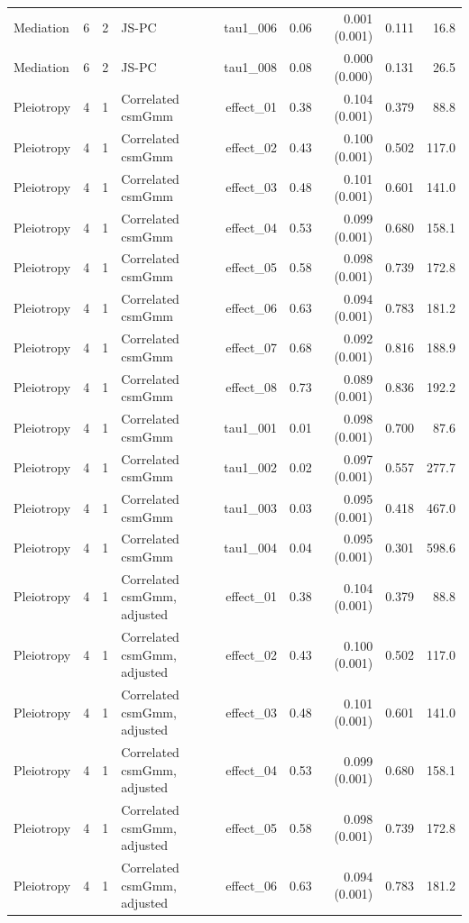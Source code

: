 \begin{longtable}{lcclrrrrr}
Mediation & 6 & 2 & JS-PC & tau1\_006 & 0.06 & 0.001 (0.001) & 0.111 & 16.8\\
Mediation & 6 & 2 & JS-PC & tau1\_008 & 0.08 & 0.000 (0.000) & 0.131 & 26.5\\
Pleiotropy & 4 & 1 & Correlated csmGmm & effect\_01 & 0.38 & 0.104 (0.001) & 0.379 & 88.8\\
Pleiotropy & 4 & 1 & Correlated csmGmm & effect\_02 & 0.43 & 0.100 (0.001) & 0.502 & 117.0\\
Pleiotropy & 4 & 1 & Correlated csmGmm & effect\_03 & 0.48 & 0.101 (0.001) & 0.601 & 141.0\\
Pleiotropy & 4 & 1 & Correlated csmGmm & effect\_04 & 0.53 & 0.099 (0.001) & 0.680 & 158.1\\
Pleiotropy & 4 & 1 & Correlated csmGmm & effect\_05 & 0.58 & 0.098 (0.001) & 0.739 & 172.8\\
Pleiotropy & 4 & 1 & Correlated csmGmm & effect\_06 & 0.63 & 0.094 (0.001) & 0.783 & 181.2\\
Pleiotropy & 4 & 1 & Correlated csmGmm & effect\_07 & 0.68 & 0.092 (0.001) & 0.816 & 188.9\\
Pleiotropy & 4 & 1 & Correlated csmGmm & effect\_08 & 0.73 & 0.089 (0.001) & 0.836 & 192.2\\
Pleiotropy & 4 & 1 & Correlated csmGmm & tau1\_001 & 0.01 & 0.098 (0.001) & 0.700 & 87.6\\
Pleiotropy & 4 & 1 & Correlated csmGmm & tau1\_002 & 0.02 & 0.097 (0.001) & 0.557 & 277.7\\
Pleiotropy & 4 & 1 & Correlated csmGmm & tau1\_003 & 0.03 & 0.095 (0.001) & 0.418 & 467.0\\
Pleiotropy & 4 & 1 & Correlated csmGmm & tau1\_004 & 0.04 & 0.095 (0.001) & 0.301 & 598.6\\
Pleiotropy & 4 & 1 & Correlated csmGmm, adjusted & effect\_01 & 0.38 & 0.104 (0.001) & 0.379 & 88.8\\
Pleiotropy & 4 & 1 & Correlated csmGmm, adjusted & effect\_02 & 0.43 & 0.100 (0.001) & 0.502 & 117.0\\
Pleiotropy & 4 & 1 & Correlated csmGmm, adjusted & effect\_03 & 0.48 & 0.101 (0.001) & 0.601 & 141.0\\
Pleiotropy & 4 & 1 & Correlated csmGmm, adjusted & effect\_04 & 0.53 & 0.099 (0.001) & 0.680 & 158.1\\
Pleiotropy & 4 & 1 & Correlated csmGmm, adjusted & effect\_05 & 0.58 & 0.098 (0.001) & 0.739 & 172.8\\
Pleiotropy & 4 & 1 & Correlated csmGmm, adjusted & effect\_06 & 0.63 & 0.094 (0.001) & 0.783 & 181.2\\

\end{longtable}
